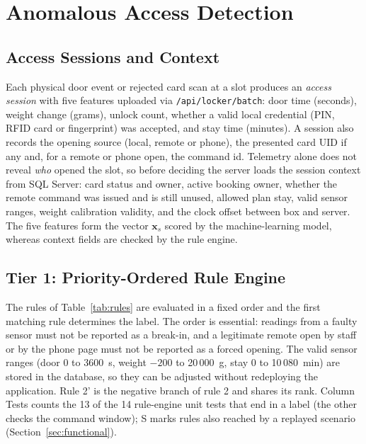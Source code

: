 \documentclass[journal,onecolumn]{IEEEtran}
\begin{document}
\section{Anomalous Access Detection}

\subsection{Access Sessions and Context}

Each physical door event or rejected card scan at a slot produces an \emph{access session} with five features uploaded
via \texttt{/api/locker/batch}: door time (seconds), weight change (grams), unlock count, whether a valid local
credential (PIN, RFID card or fingerprint) was accepted, and stay time (minutes). A session also records the opening
source (local, remote or phone), the presented card UID if any and, for a remote or phone open, the command id.
Telemetry alone does not reveal \emph{who} opened the slot, so before deciding the server loads the session context
from SQL Server: card status and owner, active booking owner, whether the remote command was issued and is still
unused, allowed plan stay, valid sensor ranges, weight calibration validity, and the clock offset between box and
server. The five features form the vector $\mathbf{x}_s$ scored by the machine-learning model, whereas context fields
are checked by the rule engine.

\subsection{Tier 1: Priority-Ordered Rule Engine}

The rules of Table~\ref{tab:rules} are evaluated in a fixed order and the first matching rule determines the label.
The order is essential: readings from a faulty sensor must not be reported as a break-in, and a legitimate remote open
by staff or by the phone page must not be reported as a forced opening. The valid sensor ranges (door 0 to 3600~s,
weight $-200$ to 20\,000~g, stay 0 to 10\,080~min) are stored in the database, so they can be adjusted without
redeploying the application. Rule 2' is the negative branch of rule 2 and shares its rank. Column Tests counts the 13
of the 14 rule-engine unit tests that end in a label (the other checks the command window); S marks rules also reached by
a replayed scenario (Section~\ref{sec:functional}).
\end{document}
